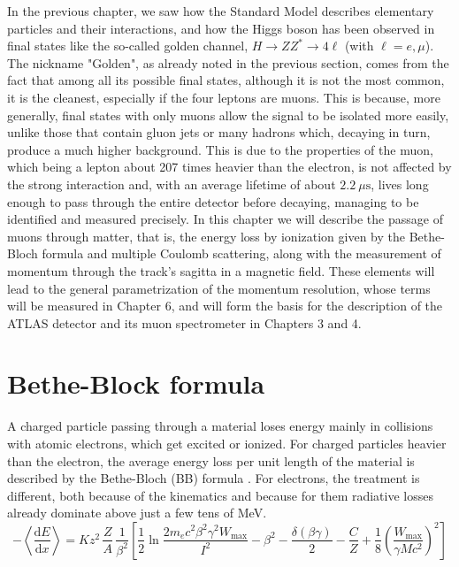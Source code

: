 \documentclass[11pt,a4paper,twoside,openright]{report}
\begin{document}
In the previous chapter, we saw how the Standard Model describes elementary particles and their interactions, and how the Higgs boson has been observed in final states like the so-called golden channel, $H \to ZZ^* \to 4\ell$ (with $\ell = e, \mu$). The nickname "Golden", as already noted in the previous section, comes from the fact that among all its possible final states, although it is not the most common, it is the cleanest, especially if the four leptons are muons. This is because, more generally, final states with only muons allow the signal to be isolated more easily, unlike those that contain gluon jets or many hadrons which, decaying in turn, produce a much higher background. This is due to the properties of the muon, which being a lepton about 207 times heavier than the electron, is not affected by the strong interaction and, with an average lifetime of about $2.2~\mu\text{s}$, lives long enough to pass through the entire detector before decaying, managing to be identified and measured precisely. In this chapter we will describe the passage of muons through matter, that is, the energy loss by ionization given by the Bethe-Bloch formula and multiple Coulomb scattering, along with the measurement of momentum through the track's sagitta in a magnetic field. These elements will lead to the general parametrization of the momentum resolution, whose terms will be measured in Chapter 6, and will form the basis for the description of the ATLAS detector and its muon spectrometer in Chapters 3 and 4.

\section{Bethe-Block formula}

A charged particle passing through a material loses energy mainly in collisions with atomic electrons, which get excited or ionized. For charged particles heavier than the electron, the average energy loss per unit length of the material is described by the Bethe-Bloch (BB) formula \cite{PDG2026}. For electrons, the treatment is different, both because of the kinematics and because for them radiative losses already dominate above just a few tens of MeV. 
\begin{equation}
  -\left\langle \frac{\mathrm{d}E}{\mathrm{d}x} \right\rangle
  = K z^2 \, \frac{Z}{A} \, \frac{1}{\beta^2}
  \left[ \frac{1}{2} \ln \frac{2 m_e c^2 \beta^2 \gamma^2 W_{\max}}{I^2}
  - \beta^2 - \frac{\delta(\beta\gamma)}{2} - \frac{C}{Z}
  + \frac{1}{8} \left( \frac{W_{\max}}{\gamma M c^2} \right)^{2} \right]
  \label{eq:bethe_muon}
\end{equation}
\end{document}
